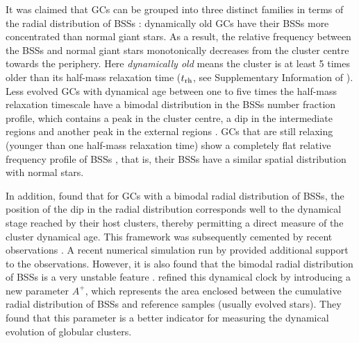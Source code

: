 \documentclass[useAMS,usenatbib,twocolumn]{mnras}
\begin{document}
It was claimed that GCs can be grouped into three distinct families in terms of the radial distribution of BSSs \citep{Ferr12a}: dynamically old GCs have their BSSs more concentrated than normal giant stars. As a result, the relative frequency between the BSSs and normal giant stars monotonically decreases from the cluster centre towards the periphery. Here {\it dynamically old} means the cluster is at least 5 times older than its half-mass relaxation time ($t_{\rm rh}$, see Supplementary Information of \cite{Ferr12a}). Less evolved GCs with dynamical age between one to five times the half-mass relaxation timescale have a bimodal distribution in the BSSs number fraction profile, which contains a peak in the cluster centre, a dip in the intermediate regions and another peak in the external regions \citep[e.g.,][]{Ferr97a,Li13a}. GCs that are still relaxing (younger than one half-mass relaxation time) show a completely flat relative frequency profile of BSSs \citep[e.g.,][]{Dale08a}, that is, their BSSs have a similar spatial distribution with normal stars. 

In addition, \cite{Ferr12a} found that for GCs with a bimodal radial distribution of BSSs, the position of the dip in the radial distribution corresponds well to the dynamical stage reached by their host clusters, thereby permitting a direct measure of the cluster dynamical age. This framework was subsequently cemented by recent observations \citep[e.g.,][]{Dale13a,Sann14a}. A recent numerical simulation run by \cite{2015ApJ...799...44M} provided additional support to the observations. However, it is also found that the bimodal radial distribution of BSSs is a very unstable feature \citep{Hypk17a}. \cite{2016ApJ...833L..29L,2016ApJ...833..252A} refined this dynamical clock by introducing a new parameter $A^{+}$, which represents the area enclosed between the cumulative radial distribution of BSSs and reference samples (usually evolved stars). They found that this parameter is a better indicator for measuring the dynamical evolution of globular clusters. 
\end{document}
